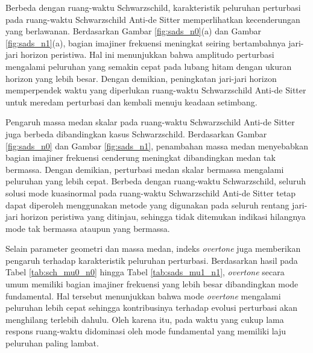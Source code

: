 Berbeda dengan ruang-waktu Schwarzschild, karakteristik peluruhan perturbasi pada ruang-waktu Schwarzschild Anti-de Sitter memperlihatkan kecenderungan yang berlawanan. Berdasarkan Gambar \ref{fig:sads_n0}(a) dan Gambar \ref{fig:sads_n1}(a), bagian imajiner frekuensi meningkat seiring bertambahnya jari-jari horizon peristiwa. Hal ini menunjukkan bahwa amplitudo perturbasi mengalami peluruhan yang semakin cepat pada lubang hitam dengan ukuran horizon yang lebih besar. Dengan demikian, peningkatan jari-jari horizon memperpendek waktu yang diperlukan ruang-waktu Schwarzschild Anti-de Sitter untuk meredam perturbasi dan kembali menuju keadaan setimbang.

Pengaruh massa medan skalar pada ruang-waktu Schwarzschild Anti-de Sitter juga berbeda dibandingkan kasus Schwarzschild. Berdasarkan Gambar \ref{fig:sads_n0} dan Gambar \ref{fig:sads_n1}, penambahan massa medan menyebabkan bagian imajiner frekuensi cenderung meningkat dibandingkan medan tak bermassa. Dengan demikian, perturbasi medan skalar bermassa mengalami peluruhan yang lebih cepat. Berbeda dengan ruang-waktu Schwarzschild, seluruh solusi mode kuasinormal pada ruang-waktu Schwarzschild Anti-de Sitter tetap dapat diperoleh menggunakan metode yang digunakan pada seluruh rentang jari-jari horizon peristiwa yang ditinjau, sehingga tidak ditemukan indikasi hilangnya mode tak bermassa ataupun yang bermassa.

Selain parameter geometri dan massa medan, indeks \textit{overtone} juga memberikan pengaruh terhadap karakteristik peluruhan perturbasi. Berdasarkan hasil pada Tabel \ref{tab:sch_mu0_n0} hingga Tabel \ref{tab:sads_mu1_n1}, \textit{overtone} secara umum memiliki bagian imajiner frekuensi yang lebih besar dibandingkan mode fundamental. Hal tersebut menunjukkan bahwa mode \textit{overtone} mengalami peluruhan lebih cepat sehingga kontribusinya terhadap evolusi perturbasi akan menghilang terlebih dahulu. Oleh karena itu, pada waktu yang cukup lama respons ruang-waktu didominasi oleh mode fundamental yang memiliki laju peluruhan paling lambat.